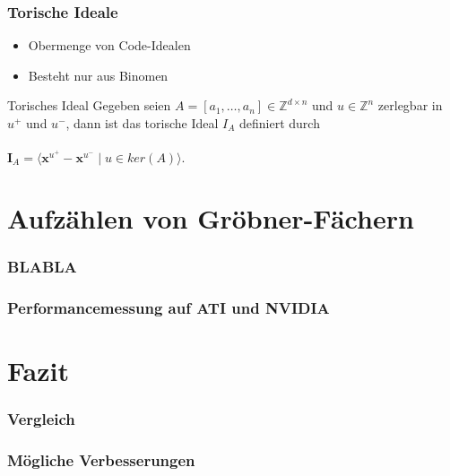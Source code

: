 \documentclass{beamer}
\begin{document}
\begin{frame}[fragile]
\frametitle{Torische Ideale}

\begin{itemize}
\item Obermenge von Code-Idealen
\item Besteht nur aus Binomen
\end{itemize}

\begin{block}{Torisches Ideal}
Gegeben seien $A =\left[a_{1},\dots, a_{n}  \right] \in \mathbb{Z}^{d \times n } $ und $u \in \mathbb{Z}^{n}$ zerlegbar in $u^{+}$ und $u^{-}$, dann ist das torische Ideal $I_{A}$ definiert durch \\
~\\
\centering
$ \textbf{I}_{A} = \langle \textbf{x}^{u^{+}} - \textbf{x}^{u^{-}} \mid u \in ker \left(  A \right) \rangle . $ 

\end{block}


\end{frame}
\section{Aufzählen von Gröbner-Fächern}


\begin{frame}
\frametitle{BLABLA}

\end{frame}

\begin{frame}
\frametitle{Performancemessung auf ATI und NVIDIA}


\end{frame}


\section{Fazit}

\begin{frame}
\frametitle{Vergleich}


	
\end{frame}


\begin{frame}
\frametitle{M\"ogliche Verbesserungen}


 
\end{frame}
\end{document}
